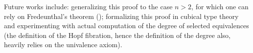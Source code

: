 \documentclass[english,a4]{article}
\def\U{\universe U}%
\begin{document}
Future works include: generalizing this proof to the case $n>2$, for
which one can rely on Fredeunthal's theorem (\cite[Ch.~8.?]{HoTT});
formalizing this proof in cubical type theory and experimenting with
actual computation of the degree of selected equivalences (the
definition of the Hopf fibration, hence the definition of the degree
also, heavily relies on the univalence axiom).





\end{document}

